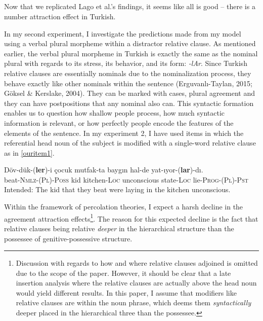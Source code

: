 \documentclass[english,doc]{apa6}
\begin{document}
\hypertarget{section}{%
\subsection{}\label{section}}

Now that we replicated Lago et al.'s findings, it seems like all is good -- there is a number attraction effect in Turkish.

In my second experiment, I investigate the predictions made from my model using a verbal plural morpheme within a distractor relative clause. As mentioned earlier, the verbal plural morpheme in Turkish is exactly the same as the nominal plural with regards to its stress, its behavior, and its form: \emph{-lAr}. Since Turkish relative clauses are essentially nominals due to the nominalization process, they behave exactly like other nominals within the sentence (Erguvanlı-Taylan, 2015; Göksel \& Kerslake, 2004). They can be marked with cases, plural agreement and they can have postpositions that any nominal also can. This syntactic formation enables us to question how shallow people process, how much syntactic information is relevant, or how perfectly people encode the features of the elements of the sentence. In my experiment 2, I have used items in which the referential head noun of the subject is modified with a single-word relative clause as in \autoref{ouritem1}.

\begin{exe}
  \ex \label{ouritem1}
      \gll Döv-dük-(\textbf{ler})-i çocuk mutfak-ta baygın hal-de yat-ıyor-(\textbf{lar})-dı.\\
  beat-\textsc{Nmlz}-(\textsc{Pl})-\textsc{Poss} kid kitchen-\textsc{Loc} unconscious state-\textsc{Loc} lie-\textsc{Prog}-(\textsc{Pl})-\textsc{Pst}\\
      \glt Intended: The kid that they beat were laying in the kitchen unconscious.
\end{exe}

Within the framework of percolation theories, I expect a harsh decline in the agreement attraction effects\footnote{Discussion with regards to how and where relative clauses adjoined is omitted due to the scope of the paper. However, it should be clear that a late insertion analysis where the relative clauses are actually above the head noun would yield different results. In this paper, I assume that modifiers like relative clauses are within the noun phrase, which deems them \textit{syntactically} deeper placed in the hierarchical three than the possessee.}. The reason for this expected decline is the fact that relative clauses being relative \emph{deeper} in the hierarchical structure than the possessee of genitive-possessive structure.
\end{document}
